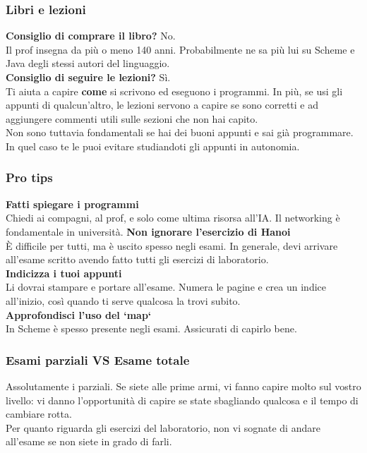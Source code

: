 \documentclass[18pt]{extarticle}
\begin{document}
\subsubsection{Libri e lezioni}
\textbf{Consiglio di comprare il libro?} No.\\
Il prof insegna da più o meno 140 anni. Probabilmente ne sa più lui su Scheme e Java degli stessi autori del linguaggio.\\
\textbf{Consiglio di seguire le lezioni?} Sì.\\
Ti aiuta a capire \textbf{come} si scrivono ed eseguono i programmi. In più, se usi gli appunti di qualcun'altro, le lezioni servono a capire se sono corretti e ad aggiungere commenti utili sulle sezioni che non hai capito.\\
Non sono tuttavia fondamentali se hai dei buoni appunti e sai già programmare. In quel caso te le puoi evitare studiandoti gli appunti in autonomia.



\subsubsection{Pro tips}
\textbf{Fatti spiegare i programmi}\\
Chiedi ai compagni, al prof, e solo come ultima risorsa all'IA. Il networking è fondamentale in università.
\textbf{Non ignorare l'esercizio di Hanoi}\\
È difficile per tutti, ma è uscito spesso negli esami. In generale, devi arrivare all'esame scritto avendo fatto tutti gli esercizi di laboratorio.\\
\textbf{Indicizza i tuoi appunti}\\
Li dovrai stampare e portare all'esame. Numera le pagine e crea un indice all'inizio, così quando ti serve qualcosa la trovi subito.\\
\textbf{Approfondisci l'uso del `map`}\\
In Scheme è spesso presente negli esami. Assicurati di capirlo bene.

\subsubsection{Esami parziali VS Esame totale} 
Assolutamente i parziali. Se siete alle prime armi, vi fanno capire molto sul vostro livello: vi danno l'opportunità di capire se state sbagliando qualcosa e il tempo di cambiare rotta.\\
Per quanto riguarda gli esercizi del laboratorio, non vi sognate di andare all'esame se non siete in grado di farli.\\
\end{document}
